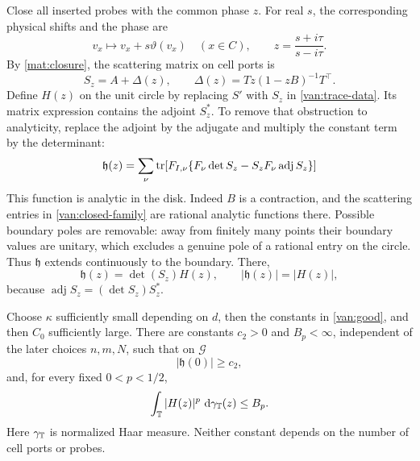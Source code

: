 Close all inserted probes with the common phase $z$. For real $s$,
the corresponding physical shifts and the phase are
\begin{equation}\label{van:twist-parameter}
 v_x\longmapsto v_x+s\vartheta(v_x)\quad (x\in C),
 \qquad z=\frac{s+i\tau}{s-i\tau}.
\end{equation}
By \cref{mat:closure}, the scattering matrix on cell ports is
\begin{equation}\label{van:closed-family}
 S_z=A+\Delta(z),\qquad
 \Delta(z)=Tz(1-zB)^{-1}T^\top.
\end{equation}
Define $H(z)$ on the unit circle by replacing $S'$ with $S_z$ in
\cref{van:trace-data}. Its matrix expression contains the adjoint
$S_z^*$. To remove that obstruction to analyticity, replace the adjoint
by the adjugate and multiply the constant term by the determinant:
\begin{equation}\label{van:analytic-function}
 \mathfrak h(z)=\sum_\nu\operatorname{tr}\!\left[
 F_{I,\nu}\{F_\nu\det S_z-S_zF_\nu\operatorname{adj}S_z\}\right]
\end{equation}
This function is analytic in the disk. Indeed $B$ is a contraction, and the
scattering entries in \cref{van:closed-family} are rational analytic
functions there. Possible boundary poles are removable: away from
finitely many points their boundary values are unitary, which excludes
a genuine pole of a rational entry on the circle. Thus
$\mathfrak h$ extends continuously to the boundary. There,
\begin{equation}\label{van:boundary-modulus}
 \mathfrak h(z)=\det(S_z)H(z),\qquad
 |\mathfrak h(z)|=|H(z)|,
\end{equation}
because $\operatorname{adj}S_z=(\det S_z)S_z^*$.

\begin{lemma}\label{van:analytic-bounds}
Choose $\kappa$ sufficiently small depending on $d$, then the
constants in \cref{van:good}, and then $C_0$ sufficiently large.
There are constants $c_2>0$ and $B_p<\infty$, independent of the
later choices $n,m,N$, such that on $\mathcal G$
\begin{equation}\label{van:central-bound}
 |\mathfrak h(0)|\geq c_2,
\end{equation}
and, for every fixed $0<p<1/2$,
\begin{equation}\label{van:hardy-bound}
 \int_{\mathbb T}|H(z)|^p\,\,\mathrm d\gamma_{\mathbb T}(z)\leq B_p.
\end{equation}
Here $\gamma_{\mathbb T}$ is normalized Haar measure. Neither constant
depends on the number of cell ports or probes.
\end{lemma}

